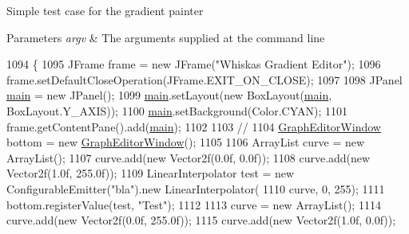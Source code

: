 Simple test case for the gradient painter


\begin{DoxyParams}{Parameters}
{\em argv} & The arguments supplied at the command line \\
\hline
\end{DoxyParams}

\begin{DoxyCode}
1094                                            \{
1095         JFrame frame = \textcolor{keyword}{new} JFrame(\textcolor{stringliteral}{"Whiskas Gradient Editor"});
1096         frame.setDefaultCloseOperation(JFrame.EXIT\_ON\_CLOSE);
1097 
1098         JPanel \mbox{\hyperlink{classorg_1_1newdawn_1_1slick_1_1tools_1_1peditor_1_1_graph_editor_window_a23eceece59208a68fdfe2b6bd742b716}{main}} = \textcolor{keyword}{new} JPanel();
1099         \mbox{\hyperlink{classorg_1_1newdawn_1_1slick_1_1tools_1_1peditor_1_1_graph_editor_window_a23eceece59208a68fdfe2b6bd742b716}{main}}.setLayout(\textcolor{keyword}{new} BoxLayout(\mbox{\hyperlink{classorg_1_1newdawn_1_1slick_1_1tools_1_1peditor_1_1_graph_editor_window_a23eceece59208a68fdfe2b6bd742b716}{main}}, BoxLayout.Y\_AXIS));
1100         \mbox{\hyperlink{classorg_1_1newdawn_1_1slick_1_1tools_1_1peditor_1_1_graph_editor_window_a23eceece59208a68fdfe2b6bd742b716}{main}}.setBackground(Color.CYAN);
1101         frame.getContentPane().add(\mbox{\hyperlink{classorg_1_1newdawn_1_1slick_1_1tools_1_1peditor_1_1_graph_editor_window_a23eceece59208a68fdfe2b6bd742b716}{main}});
1102 
1103         \textcolor{comment}{//}
1104         \mbox{\hyperlink{classorg_1_1newdawn_1_1slick_1_1tools_1_1peditor_1_1_graph_editor_window_a911930b16a14158845d629acef27a129}{GraphEditorWindow}} bottom = \textcolor{keyword}{new} \mbox{\hyperlink{classorg_1_1newdawn_1_1slick_1_1tools_1_1peditor_1_1_graph_editor_window_a911930b16a14158845d629acef27a129}{GraphEditorWindow}}();
1105 
1106         ArrayList curve = \textcolor{keyword}{new} ArrayList();
1107         curve.add(\textcolor{keyword}{new} Vector2f(0.0f, 0.0f));
1108         curve.add(\textcolor{keyword}{new} Vector2f(1.0f, 255.0f));
1109         LinearInterpolator test = \textcolor{keyword}{new} ConfigurableEmitter(\textcolor{stringliteral}{"bla"}).new LinearInterpolator(
1110                 curve, 0, 255);
1111         bottom.registerValue(test, \textcolor{stringliteral}{"Test"});
1112 
1113         curve = \textcolor{keyword}{new} ArrayList();
1114         curve.add(\textcolor{keyword}{new} Vector2f(0.0f, 255.0f));
1115         curve.add(\textcolor{keyword}{new} Vector2f(1.0f, 0.0f));

\end{DoxyCode}
